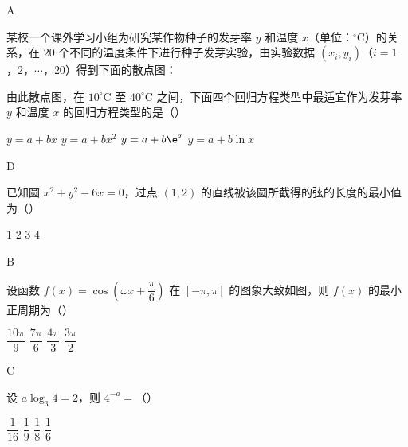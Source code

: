 \begin{answer}
A
\end{answer}

\begin{problem}
某校一个课外学习小组为研究某作物种子的发芽率 \(y\) 和温度 \(x\)（单位：\(^{\circ}\mathrm{C}\)）的关系，在 \(20\) 个不同的温度条件下进行种子发芽实验，由实验数据 \((x_i,y_i)\)（\(i=1\)，\(2\)，\(\cdots\)，\(20\)）得到下面的散点图：


由此散点图，在 \(10^{\circ}\mathrm{C}\) 至 \(40^{\circ}\mathrm{C}\) 之间，下面四个回归方程类型中最适宜作为发芽率 \(y\) 和温度 \(x\) 的回归方程类型的是（\quad）

\choices
    {\(y=a+bx\)}
    {\(y=a+bx^2\)}
    {\(y=a+b\e^x\)}
    {\(y=a+b\ln x\)}
\end{problem}

\begin{answer}
D
\end{answer}

\begin{problem}
已知圆 \(x^2+y^2-6x=0\)，过点 \((1,2)\) 的直线被该圆所截得的弦的长度的最小值为（\quad）

\choices
    {\(1\)}
    {\(2\)}
    {\(3\)}
    {\(4\)}
\end{problem}

\begin{answer}
B
\end{answer}

\begin{problem}
设函数 \(f(x)=\cos\left(\omega x+\dfrac{\pi}{6}\right)\) 在 \([-\pi,\pi]\) 的图象大致如图，则 \(f(x)\) 的最小正周期为（\quad）


\choices
    {\(\dfrac{10\pi}{9}\)}
    {\(\dfrac{7\pi}{6}\)}
    {\(\dfrac{4\pi}{3}\)}
    {\(\dfrac{3\pi}{2}\)}
\end{problem}

\begin{answer}
C
\end{answer}

\begin{problem}
设 \(a\log_3 4=2\)，则 \(4^{-a}=\)（\quad）

\choices
    {\(\dfrac{1}{16}\)}
    {\(\dfrac{1}{9}\)}
    {\(\dfrac{1}{8}\)}
    {\(\dfrac{1}{6}\)}
\end{problem}


